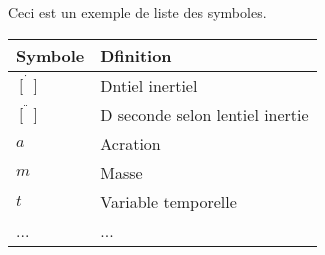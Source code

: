 Ceci est un exemple de liste des symboles.

\begin{center}
\begin{tabular}{ll}
\hline
\textbf{Symbole} & \textbf{Dfinition} \\ \hline\hline
$\dot{[~]}$  & Dntiel inertiel \\
$\ddot{[~]}$ & D seconde selon lentiel inertie \\
$a$ & Acration \\
$m$ & Masse \\
$t$ & Variable temporelle \\
... & ... \\
\hline
\end{tabular}
\end{center}
